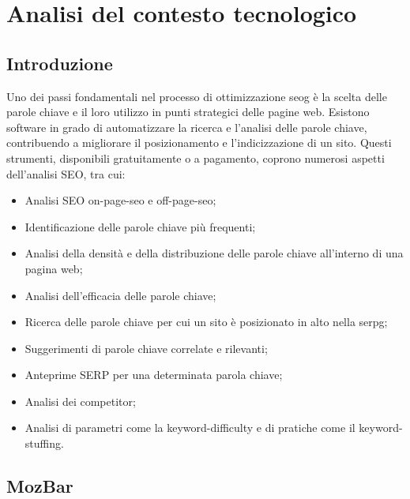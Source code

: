 \chapter{Analisi del contesto tecnologico}
\label{cap:analisi-soluzioni-esistenti}


\section{Introduzione}

\par Uno dei passi fondamentali nel processo di ottimizzazione \gls{seog} è la scelta delle parole chiave e il loro utilizzo in punti strategici delle pagine web. Esistono software in grado di automatizzare la ricerca e l'analisi delle parole chiave, contribuendo a migliorare il posizionamento e l'indicizzazione di un sito. Questi strumenti, disponibili gratuitamente o a pagamento, coprono numerosi aspetti dell'analisi SEO, tra cui:
\begin{itemize}
    \item Analisi SEO \gls{on-page-seo} e \gls{off-page-seo};
    \item Identificazione delle parole chiave più frequenti;
    \item Analisi della densità e della distribuzione delle parole chiave all'interno di una pagina web;
    \item Analisi dell'efficacia delle parole chiave;
    \item Ricerca delle parole chiave per cui un sito è posizionato in alto nella \gls{serpg};
    \item Suggerimenti di parole chiave correlate e rilevanti;
    \item Anteprime SERP per una determinata parola chiave;
    \item Analisi dei competitor;
    \item Analisi di parametri come la \gls{keyword-difficulty} e di pratiche come il \gls{keyword-stuffing}.
\end{itemize}

\section{MozBar}

